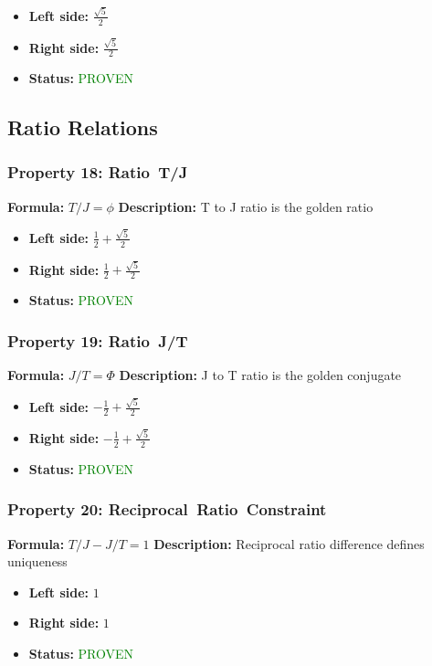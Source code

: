 \begin{itemize}
\item \textbf{Left side:} $\frac{\sqrt{5}}{2}$
\item \textbf{Right side:} $\frac{\sqrt{5}}{2}$
\item \textbf{Status:} \textcolor{green}{PROVEN}
\end{itemize}


\subsection{Ratio Relations}

\subsubsection*{Property 18: Ratio~T/J}
\textbf{Formula:} $T/J = \phi$
\textbf{Description:} T to J ratio is the golden ratio

\begin{itemize}
\item \textbf{Left side:} $\frac{1}{2} + \frac{\sqrt{5}}{2}$
\item \textbf{Right side:} $\frac{1}{2} + \frac{\sqrt{5}}{2}$
\item \textbf{Status:} \textcolor{green}{PROVEN}
\end{itemize}

\subsubsection*{Property 19: Ratio~J/T}
\textbf{Formula:} $J/T = \Phi$
\textbf{Description:} J to T ratio is the golden conjugate

\begin{itemize}
\item \textbf{Left side:} $- \frac{1}{2} + \frac{\sqrt{5}}{2}$
\item \textbf{Right side:} $- \frac{1}{2} + \frac{\sqrt{5}}{2}$
\item \textbf{Status:} \textcolor{green}{PROVEN}
\end{itemize}

\subsubsection*{Property 20: Reciprocal~Ratio~Constraint}
\textbf{Formula:} $T/J - J/T = 1$
\textbf{Description:} Reciprocal ratio difference defines uniqueness

\begin{itemize}
\item \textbf{Left side:} $1$
\item \textbf{Right side:} $1$
\item \textbf{Status:} \textcolor{green}{PROVEN}
\end{itemize}

